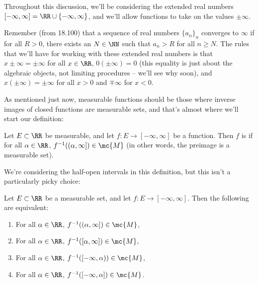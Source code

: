 \begin{fact}
Throughout this discussion, we'll be considering the extended real numbers $[-\infty, \infty] = \RR \cup \{-\infty, \infty\}$, and we'll allow functions to take on the values $\pm \infty$. 
\end{fact}

Remember (from 18.100) that a sequence of real numbers $\{a_n\}_n$ converges to $\infty$ if for all $R > 0$, there exists an $N \in \NN$ such that $a_n > R$ for all $n \ge N$. The rules that we'll have for working with these extended real numbers is that $x \pm \infty = \pm \infty$ for all $x \in \RR$, $0 (\pm \infty) = 0$ (this equality is just about the algebraic objects, not limiting procedures -- we'll see why soon), and $x(\pm \infty) = \pm \infty$ for all $x > 0$ and $\mp \infty$ for $x < 0$.

As mentioned just now, measurable functions should be those where inverse images of closed functions are measurable sets, and that's almost where we'll start our definition:

\begin{definition}
Let $E \subset \RR$ be measurable, and let $f: E \to [-\infty, \infty]$ be a function. Then $f$ is  if for all $\alpha \in \RR$, $f^{-1}((\alpha, \infty]) \in \mc{M}$ (in other words, the preimage is a measurable set).
\end{definition}

We're considering the half-open intervals in this definition, but this isn't a particularly picky choice:

\begin{theorem}\label{fourmeasureequiv}
Let $E \subset \RR$ be a measurable set, and let $f: E \to [-\infty, \infty]$. Then the following are equivalent:
\begin{enumerate}
\item For all $\alpha \in \RR$, $f^{-1}((\alpha, \infty]) \in \mc{M}$,
\item For all $\alpha \in \RR$, $f^{-1}([\alpha, \infty]) \in \mc{M}$,
\item For all $\alpha \in \RR$, $f^{-1}([-\infty, \alpha)) \in \mc{M}$,
\item For all $\alpha \in \RR$, $f^{-1}([-\infty, \alpha]) \in \mc{M}$.
\end{enumerate}
\end{theorem}

